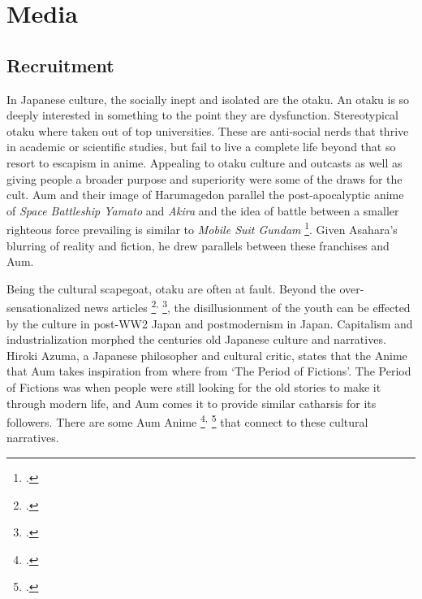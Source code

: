 \documentclass[12pt, letterpaper]{article}
\newcommand{\sorta}[1]{`#1'}
\newcommand{\poses}[1]{#1's}
\begin{document}
\section{Media}
\subsection{Recruitment}
In Japanese culture, the socially inept and isolated are the otaku. An otaku is so deeply interested in
something to the point they are dysfunction. Stereotypical otaku where taken out of top universities. These
are anti-social nerds that thrive in academic or scientific studies, but fail to live a complete life beyond
that so resort to escapism in anime. Appealing to otaku culture and
outcasts as well as giving people a broader purpose and superiority were some of the draws for the cult. Aum
and their image of Harumagedon parallel the post-apocalyptic anime of \textit{Space Battleship Yamato} and
\textit{Akira} and the idea of battle between a smaller righteous force prevailing is similar to
\textit{Mobile Suit Gundam} \footcite{macwilliams_japanese_2008}. Given \poses{Asahara} blurring of reality and fiction, he drew parallels between these franchises and Aum. 

Being the cultural scapegoat, otaku are often at fault. Beyond the over-sensationalized news articles \footcite{noauthor_mike_nodate}\textsuperscript{,}
\footcite{noauthor_cult_nodate}, the disillusionment of the youth can be effected by the culture in
post-WW2 Japan and postmodernism in Japan. Capitalism and industrialization morphed the centuries old Japanese culture and narratives. Hiroki
Azuma, a Japanese philosopher and cultural critic, states that the Anime that Aum takes inspiration from 
where from \sorta{The Period of Fictions}. The Period of Fictions was when people were still looking for the
old stories to make it through modern life, and Aum comes it to provide similar catharsis for its followers.
There are some Aum Anime \footcite{noauthor_aum_nodate}\textsuperscript{,} \footcite{noauthor_aum_nodate-1}
that connect to these cultural narratives.
\end{document}
